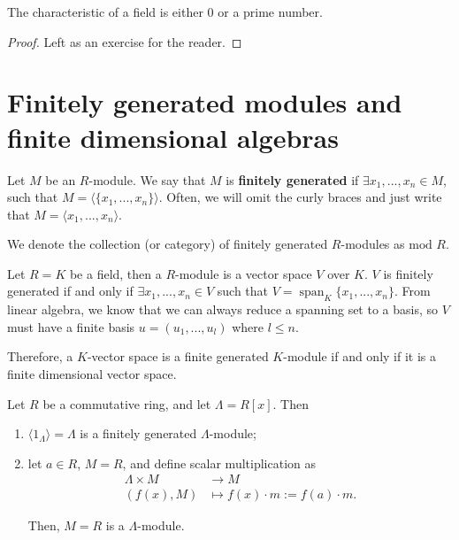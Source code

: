 \documentclass[12pt, a4paper, titlepage]{report}
\DeclareMathOperator{\vspan}{span}
\newcommand\dangle[1]{\langle {#1} \rangle}
\begin{document}
\begin{cor}
  The characteristic of a field is either 0 or a prime number.
\end{cor}

\begin{proof} Left as an exercise for the reader. \end{proof}

\section{Finitely generated modules and finite dimensional algebras}

\begin{defn}
  Let $M$ be an $R$-module. We say that $M$ is \textbf{finitely generated} if $\exists x_1, ..., x_n \in M$, such
  that $M = \dangle{\{x_1, ..., x_n\}}$. Often, we will omit the curly braces and just write that
  $M = \dangle{x_1, ..., x_n}$.

  We denote the collection (or category) of finitely generated $R$-modules as $\text{mod } R$.
\end{defn}

\begin{exmp}
  Let $R = K$ be a field, then a $R$-module is a vector space $V$ over $K$. $V$ is finitely generated if and only if
  $\exists x_1, ..., x_n \in V$ such that $V = \vspan_K \{x_1, ..., x_n\}$. From linear algebra, we know that we can always
  reduce a spanning set to a basis, so $V$ must have a finite basis $u = (u_1, ..., u_l)$ where $l \leq n$.

  Therefore, a $K$-vector space is a finite generated $K$-module if and only if it is a finite dimensional vector space.
\end{exmp}

\begin{exmp}
  Let $R$ be a commutative ring, and let $\Lambda = R[x]$. Then

  \begin{enumerate}
  \item $\dangle{1_\Lambda} = \Lambda$ is a finitely generated $\Lambda$-module;
  \item let $a \in R$, $M = R$, and define scalar multiplication as
    \begin{align*}
      \Lambda \times M &\to M\\
      (f(x), M) &\mapsto f(x) \cdot m := f(a) \cdot m.
    \end{align*}

    Then, $M = R$ is a $\Lambda$-module.
  \end{enumerate}
\end{exmp}
\end{document}
